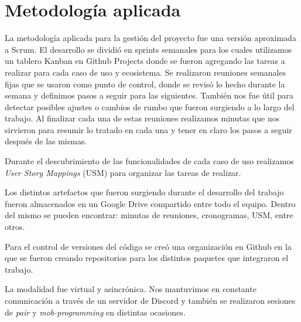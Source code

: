 \section{Metodología aplicada}

La metodología aplicada para la gestión del proyecto fue una versión aproximada a Scrum. El desarrollo se dividió en sprints semanales para los cuales utilizamos un tablero Kanban en Github Projects donde se fueron agregando las tareas a realizar para cada caso de uso y ecosistema. Se realizaron reuniones semanales fijas que se usaron como punto de control, donde se revisó lo hecho durante la semana y definimos pasos a seguir para las siguientes. También nos fue útil para detectar posibles ajustes o cambios de rumbo que fueron surgiendo a lo largo del trabajo. Al finalizar cada una de estas reuniones realizamos minutas que nos sirvieron para resumir lo tratado en cada una y tener en claro los pasos a seguir después de las mismas.

Durante el descubrimiento de las funcionalidades de cada caso de uso realizamos \textit{User Story Mappings} (USM) para organizar las tareas de realizar.

Los distintos artefactos que fueron surgiendo durante el desarrollo del trabajo fueron almacenados en un Google Drive compartido entre todo el equipo. Dentro del mismo se pueden encontrar: minutas de reuniones, cronogramas, USM, entre otros.

Para el control de versiones del código se creó una organización en Github en la que se fueron creando repositorios para los distintos paquetes que integraron el trabajo.

La modalidad fue virtual y asincrónica. Nos mantuvimos en constante comunicación a través de un servidor de Discord y también se realizaron sesiones de \textit{pair} y \textit{mob-programming} en distintas ocasiones.